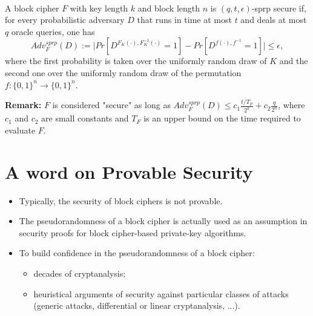 	\begin{definition}\ \\
	    A block cipher $F$ with key length $k$ and block length $n$ is $(q,t,\epsilon)$-sprp secure if, for every probabilistic adversary $D$ 
	    that runs in time at most $t$ and deals at most $q$ oracle queries, one has
	    $$Adv_F^{sprp}(D) := \vert Pr[D^{F_K(\cdot),F_K^{-1}(\cdot)}=1]-Pr[D^{f(\cdot),f^{-1}}=1] \vert \leq \epsilon,$$
	    where the first probability is taken over the uniformly random draw of $K$ and the second one over the uniformly random draw of the permutation $f: \{0,1\}^n \to \{0,1\}^n$.
	\end{definition}
	    \textbf{Remark:}\newline
	    $F$ is considered "secure" as long as $Adv_F^{sprp}(D) \leq c_1 \frac{t/T_F}{2^k} + c_2 \frac{q}{2^n}$, where $c_1$ and $c_2$ 
	    are small constants and $T_F$ is an upper bound on the time required to evaluate $F$.


\section{A word on Provable Security}
	\begin{itemize}
	    \item Typically, the security of block ciphers is not provable.
	    \item The pseudorandomness of a block cipher is actually used as an assumption in security proofs for block cipher-based private-key algorithms.
	    \item To build confidence in the pseudorandomness of a block cipher:
	    \begin{itemize}
	        \item decades of cryptanalysis;
	        \item heuristical arguments of security against particular classes of attacks (generic attacks, differential or linear cryptanalysis, ...).
	    \end{itemize}
	\end{itemize}


